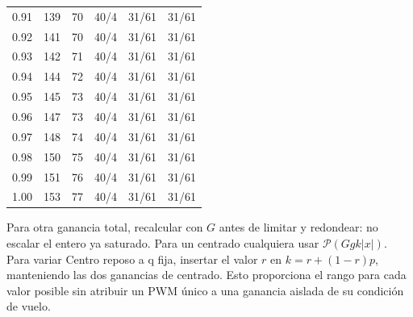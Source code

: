 \documentclass[11pt,a4paper]{article}
\begin{document}
\begin{longtable}{rrrrrr}
0.91 & 139 & 70 & 40/4 & 31/61 & 31/61 \\
0.92 & 141 & 70 & 40/4 & 31/61 & 31/61 \\
0.93 & 142 & 71 & 40/4 & 31/61 & 31/61 \\
0.94 & 144 & 72 & 40/4 & 31/61 & 31/61 \\
0.95 & 145 & 73 & 40/4 & 31/61 & 31/61 \\
0.96 & 147 & 73 & 40/4 & 31/61 & 31/61 \\
0.97 & 148 & 74 & 40/4 & 31/61 & 31/61 \\
0.98 & 150 & 75 & 40/4 & 31/61 & 31/61 \\
0.99 & 151 & 76 & 40/4 & 31/61 & 31/61 \\
1.00 & 153 & 77 & 40/4 & 31/61 & 31/61 \\
\bottomrule\end{longtable}\normalsize
Para otra ganancia total, recalcular con $G$ antes de limitar y redondear: no escalar el entero ya saturado. Para un centrado cualquiera usar $\mathcal P(Ggk|x|)$. Para variar Centro reposo a q fija, insertar el valor $r$ en $k=r+(1-r)p$, manteniendo las dos ganancias de centrado. Esto proporciona el rango para cada valor posible sin atribuir un PWM único a una ganancia aislada de su condición de vuelo.
\end{document}
